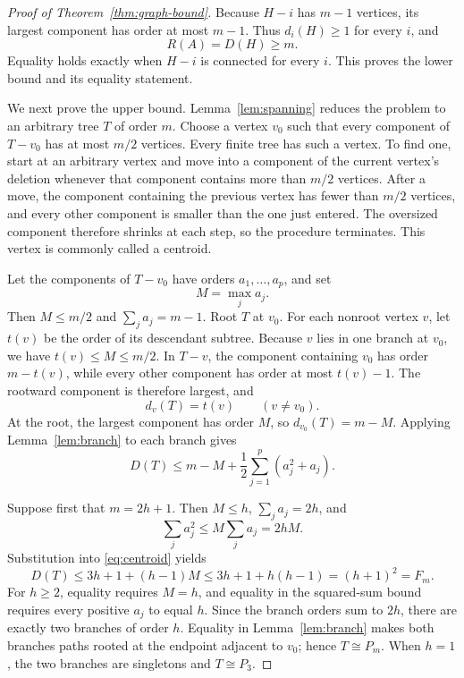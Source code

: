 \documentclass[10pt,a4paper]{amsart}
\begin{document}
\begin{proof}[Proof of Theorem~\ref{thm:graph-bound}]
Because \(H-i\) has \(m-1\) vertices, its largest component has order at most
\(m-1\). Thus \(d_i(H)\geq1\) for every \(i\), and
\[
 R(A)=D(H)\geq m.
\]
Equality holds exactly when \(H-i\) is connected for every \(i\). This proves
the lower bound and its equality statement.

We next prove the upper bound. Lemma~\ref{lem:spanning} reduces the problem to
an arbitrary tree \(T\) of order \(m\). Choose a vertex \(v_0\) such that every
component of \(T-v_0\) has at most \(m/2\) vertices. Every finite tree has such
a vertex. To find one, start at an arbitrary vertex and move into a component of the current
vertex's deletion whenever that component contains more than \(m/2\) vertices.
After a move, the component containing the previous vertex has fewer than
\(m/2\) vertices, and every other component is smaller than the one just
entered. The oversized component therefore shrinks at each step, so the
procedure terminates. This vertex is commonly called a centroid.

Let the components of \(T-v_0\) have orders \(a_1,\ldots,a_p\), and set
\[
 M=\max_j a_j.
\]
Then \(M\leq m/2\) and \(\sum_j a_j=m-1\). Root \(T\) at \(v_0\). For each
nonroot vertex \(v\), let \(t(v)\) be the order of its descendant subtree.
Because \(v\) lies in one branch at \(v_0\), we have
\(t(v)\leq M\leq m/2\). In \(T-v\), the component containing \(v_0\) has
order \(m-t(v)\), while every other component has order at most \(t(v)-1\).
The rootward component is therefore largest, and
\[
 d_v(T)=t(v)\qquad(v\ne v_0).
\]
At the root, the largest component has order \(M\), so
\(d_{v_0}(T)=m-M\). Applying Lemma~\ref{lem:branch} to each branch gives
\begin{equation}
 D(T)\leq m-M+\frac12\sum_{j=1}^p(a_j^2+a_j).
 \label{eq:centroid}
\end{equation}

Suppose first that \(m=2h+1\). Then \(M\leq h\),
\(\sum_j a_j=2h\), and
\[
 \sum_j a_j^2\leq M\sum_j a_j=2hM.
\]
Substitution into \eqref{eq:centroid} yields
\[
 D(T)\leq3h+1+(h-1)M
 \leq3h+1+h(h-1)
 =(h+1)^2=F_m.
\]
For \(h\geq2\), equality requires \(M=h\), and equality in the squared-sum
bound requires every positive \(a_j\) to equal \(h\). Since the branch orders
sum to \(2h\), there are exactly two branches of order \(h\). Equality in
Lemma~\ref{lem:branch} makes both branches paths rooted at the endpoint
adjacent to \(v_0\); hence \(T\cong P_m\). When \(h=1\), the two branches are
singletons and \(T\cong P_3\).


\end{proof}
\end{document}
